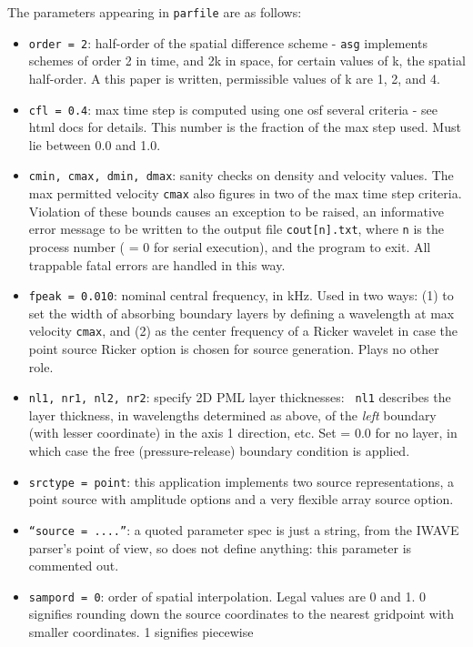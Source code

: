 The parameters appearing in {\tt parfile} are as follows:

\begin{itemize}
\item {\tt order = 2}: half-order of the spatial difference scheme -
  {\tt asg} implements schemes of order 2 in time, and 2k in space,
  for certain values of k, the spatial half-order. A this paper is
  written, permissible values of k are 1, 2, and 4.
\item {\tt cfl = 0.4}: max time step is computed using one osf several
  criteria - see html docs for details. This number is the fraction of
  the max step used. Must lie between 0.0 and 1.0.
\item{\tt cmin, cmax, dmin, dmax}: sanity checks on density and
  velocity values. The max permitted velocity {\tt cmax} also figures
  in two of the max time step criteria. Violation of these bounds
  causes an exception to be raised, an informative error message to be
  written to the output file {\tt cout[n].txt}, where {\tt n} is the
  process number ( = 0 for serial execution), and the program to
  exit. All trappable fatal errors are handled in this way.
\item {\tt fpeak = 0.010}: nominal central frequency, in kHz. Used in
  two ways: (1) to set the width of absorbing boundary layers by
  defining a wavelength at max velocity {\tt cmax}, and (2) as the
  center frequency of a Ricker wavelet in case the point source Ricker
  option is chosen for source generation. Plays no other role.
\item {\tt nl1, nr1, nl2, nr2}: specify 2D PML layer thicknesses: {\tt
    nl1} describes the layer thickness, in wavelengths determined as
  above, of the {\em left} boundary (with lesser coordinate) in the
  axis 1 direction, etc. Set = 0.0 for no layer, in which case the
  free (pressure-release) boundary condition is applied.
\item {\tt srctype = point}: this application implements two source
  representations, a point source with amplitude options and a very flexible array
  source option.
\item{\tt ``source  = ....''}: a quoted parameter spec is just a
  string, from the IWAVE parser's point of view, so does not define
  anything: this parameter is commented out.
\item{\tt sampord = 0}: order of spatial interpolation. Legal values
  are 0 and 1. 0 signifies rounding down the source coordinates to the
  nearest gridpoint with smaller coordinates. 1 signifies piecewise

\end{itemize}
